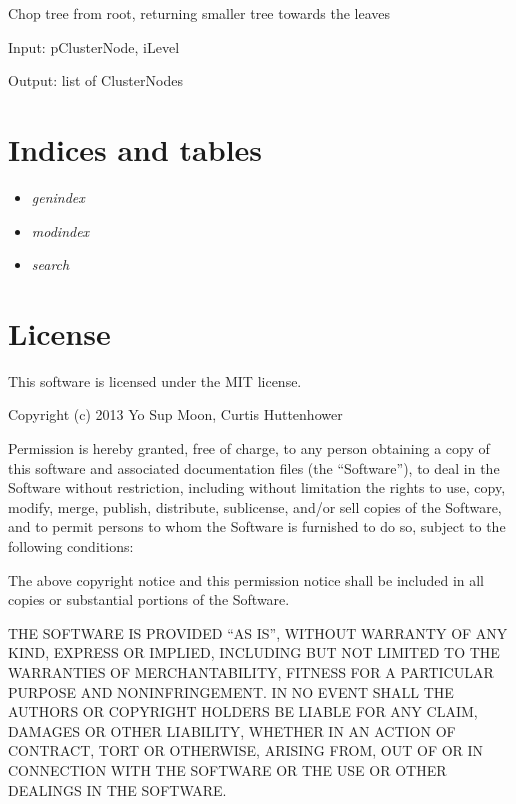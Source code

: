 \documentclass[letterpaper,10pt,english]{sphinxmanual}
\begin{document}

\begin{fulllineitems}
\label{index:halla.hierarchy.truncate_tree}
Chop tree from root, returning smaller tree towards the leaves

Input: pClusterNode, iLevel

Output: list of ClusterNodes

\end{fulllineitems}



\section{Indices and tables}
\label{index:indices-and-tables}\begin{itemize}
\item {} 
\emph{genindex}

\item {} 
\emph{modindex}

\item {} 
\emph{search}

\end{itemize}


\section{License}
\label{index:license}
This software is licensed under the MIT license.

Copyright (c) 2013 Yo Sup Moon, Curtis Huttenhower

Permission is hereby granted, free of charge, to any person obtaining a copy of this software and associated documentation files (the ``Software''), to deal in the Software without restriction, including without limitation the rights to use, copy, modify, merge, publish, distribute, sublicense, and/or sell copies of the Software, and to permit persons to whom the Software is furnished to do so, subject to the following conditions:

The above copyright notice and this permission notice shall be included in all copies or substantial portions of the Software.

THE SOFTWARE IS PROVIDED ``AS IS'', WITHOUT WARRANTY OF ANY KIND, EXPRESS OR IMPLIED, INCLUDING BUT NOT LIMITED TO THE WARRANTIES OF MERCHANTABILITY, FITNESS FOR A PARTICULAR PURPOSE AND NONINFRINGEMENT. IN NO EVENT SHALL THE AUTHORS OR COPYRIGHT HOLDERS BE LIABLE FOR ANY CLAIM, DAMAGES OR OTHER LIABILITY, WHETHER IN AN ACTION OF CONTRACT, TORT OR OTHERWISE, ARISING FROM, OUT OF OR IN CONNECTION WITH THE SOFTWARE OR THE USE OR OTHER DEALINGS IN THE SOFTWARE.
\end{document}
